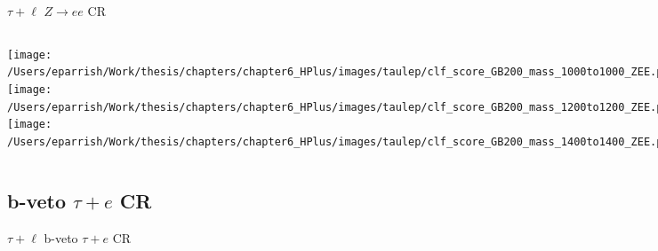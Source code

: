 \documentclass[aspectratio=169,xcolor=table]{beamer}
\begin{document}
    \begin{frame}[t]{$\tau+\ell$ $Z \rightarrow ee$ CR}
      \begin{columns}[t]
          \texttt{[image: /Users/eparrish/Work/thesis/chapters/chapter6\_HPlus/images/taulep/clf\_score\_GB200\_mass\_1000to1000\_ZEE.png]}
          \texttt{[image: /Users/eparrish/Work/thesis/chapters/chapter6\_HPlus/images/taulep/clf\_score\_GB200\_mass\_1200to1200\_ZEE.png]}
          \texttt{[image: /Users/eparrish/Work/thesis/chapters/chapter6\_HPlus/images/taulep/clf\_score\_GB200\_mass\_1400to1400\_ZEE.png]}

          \texttt{[image: /Users/eparrish/Work/thesis/chapters/chapter6\_HPlus/images/taulep/clf\_score\_GB200\_mass\_1600to1600\_ZEE.png]}
          \texttt{[image: /Users/eparrish/Work/thesis/chapters/chapter6\_HPlus/images/taulep/clf\_score\_GB200\_mass\_1800to1800\_ZEE.png]}
          \texttt{[image: /Users/eparrish/Work/thesis/chapters/chapter6\_HPlus/images/taulep/clf\_score\_GB200\_mass\_2000to2000\_ZEE.png]}

          \texttt{[image: /Users/eparrish/Work/thesis/chapters/chapter6\_HPlus/images/taulep/clf\_score\_GB200\_mass\_2500to2500\_ZEE.png]}
          \texttt{[image: /Users/eparrish/Work/thesis/chapters/chapter6\_HPlus/images/taulep/clf\_score\_GB200\_mass\_3000to3000\_ZEE.png]}


      \end{columns}
    \end{frame}

  \subsection{b-veto $\tau+e$ CR}

    \begin{frame}[c]{$\tau+\ell$ b-veto $\tau+e$ CR}
      \begin{table}
      \end{table}
    \end{frame}
\end{document}
